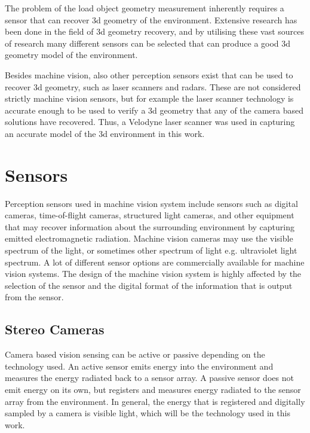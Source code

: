 \documentclass[12pt,a4paper,oneside,pdftex]{report}
\begin{document}
The problem of the load object geometry measurement inherently requires a sensor that can recover 3d geometry of the environment. Extensive research has been done in the field of 3d geometry recovery, and by utilising these vast sources of research many different sensors can be selected that can produce a good 3d geometry model of the environment.

Besides machine vision, also other perception sensors exist that can be used to recover 3d geometry, such as laser scanners and radars. These are not considered strictly machine vision sensors, but for example the laser scanner technology is accurate enough to be used to verify a 3d geometry that any of the camera based solutions have recovered\citep{You11}. Thus, a Velodyne laser scanner was used in capturing an accurate model of the 3d environment in this work.

\section{Sensors}

Perception sensors used in machine vision system include sensors such as digital cameras, time-of-flight cameras, structured light cameras, and other equipment that may recover information about the surrounding environment by capturing emitted electromagnetic radiation. Machine vision cameras may use the visible spectrum of the light, or sometimes other spectrum of light e.g. ultraviolet light spectrum. A lot of different sensor options are commercially available for machine vision systems. The design of the machine vision system is highly affected by the selection of the sensor and the digital format of the information that is output from the sensor.

\subsection{Stereo Cameras}
\label{subsection:stereo_cameras}

Camera based vision sensing can be active or passive depending on the technology used. An active sensor emits energy into the environment and measures the energy radiated back to a sensor array. A passive sensor does not emit energy on its own, but registers and measures energy radiated to the sensor array from the environment. In general, the energy that is registered and digitally sampled by a camera is visible light, which will be the technology used in this work.

\end{document}
